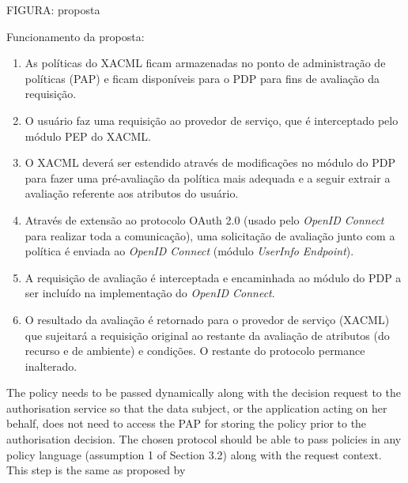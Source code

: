 \documentclass{doublecol-new}
\begin{document}
FIGURA: proposta

Funcionamento da proposta: 
\begin{enumerate}
	\item As políticas do XACML ficam armazenadas no ponto de administração de políticas (PAP) e ficam disponíveis para o PDP para fins de avaliação da requisição.
	\item O usuário faz uma requisição ao provedor de serviço, que é interceptado pelo módulo PEP do XACML.
	\item O XACML deverá ser estendido através de modificações no módulo do PDP para fazer uma pré-avaliação da política mais adequada e a seguir extrair a avaliação referente aos atributos do usuário.
	\item Através de extensão ao protocolo OAuth 2.0 (usado pelo \textit{OpenID Connect} para realizar toda a comunicação), uma solicitação de avaliação junto com a política é enviada ao \textit{OpenID Connect} (módulo \textit{UserInfo Endpoint}).
	\item A requisição de avaliação é interceptada e encaminhada ao módulo do PDP a ser incluído na implementação do \textit{OpenID Connect}.
	\item O resultado da avaliação é retornado para o provedor de serviço (XACML) que sujeitará a requisição original ao restante da avaliação de atributos (do recurso e de ambiente) e condições. O restante do protocolo permance inalterado.
\end{enumerate}   


The policy needs to be passed dynamically along with the decision request to the authorisation service so that the data
subject, or the application acting on her behalf, does not need to access the PAP for storing the policy prior to the authorisation decision. The chosen protocol should be able to pass policies in any policy language (assumption 1 of Section 3.2) along with the request context.
This step is the same as proposed by \cite{chadwick2012privacy} \cite{fatema2013adding}

\end{document}
